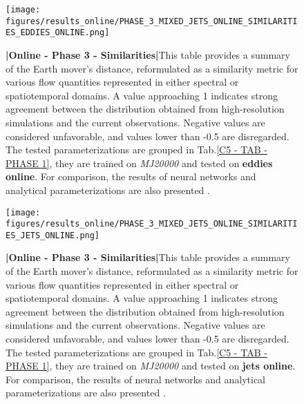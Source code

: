 %
%
\newpage

\begin{figure}[H]
    \centering
    \texttt{[image: figures/results\_online/PHASE\_3\_MIXED\_JETS\_ONLINE\_SIMILARITIES\_EDDIES\_ONLINE.png]}
    \caption{\textbf{|}\textcolor{section_color}{\textbf{Online - Phase 3 - Similarities}}\textbf{|}This table provides a summary of the Earth mover's distance, reformulated as a similarity metric for various flow quantities represented in either spectral or spatiotemporal domains. A value approaching 1 indicates strong agreement between the distribution obtained from high-resolution simulations and the current observations. Negative values are considered unfavorable, and values lower than -0.5 are disregarded. The tested parameterizations are grouped in Tab.\ref{C5 - TAB - PHASE 1}, they are trained on \textit{MJ20000}  and tested on \textbf{eddies online}. For comparison, the results of neural networks \citep{Benchmarking} and analytical parameterizations are also presented \citep{ClosureAnalytical2, ClosureAnalytical51, ClosureDataDrivenZanna}.}
    \label{APP - ONLINE - PHASE 3 - SIMILARITIES -  JETS MIXED 20000 and EDDIES ONLINE}
\end{figure}

\newpage

\begin{figure}[H]
    \centering
    \texttt{[image: figures/results\_online/PHASE\_3\_MIXED\_JETS\_ONLINE\_SIMILARITIES\_JETS\_ONLINE.png]}
    \caption{\textbf{|}\textcolor{section_color}{\textbf{Online - Phase 3 - Similarities}}\textbf{|}This table provides a summary of the Earth mover's distance, reformulated as a similarity metric for various flow quantities represented in either spectral or spatiotemporal domains. A value approaching 1 indicates strong agreement between the distribution obtained from high-resolution simulations and the current observations. Negative values are considered unfavorable, and values lower than -0.5 are disregarded. The tested parameterizations are grouped in Tab.\ref{C5 - TAB - PHASE 1}, they are trained on \textit{MJ20000}  and tested on \textbf{jets online}. For comparison, the results of neural networks \citep{Benchmarking} and analytical parameterizations are also presented \citep{ClosureAnalytical2, ClosureAnalytical51, ClosureDataDrivenZanna}.}
    \label{APP - ONLINE - PHASE 3 - SIMILARITIES -  JETS MIXED 20000 and JETS ONLINE}
\end{figure}

